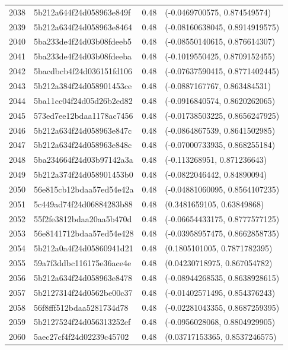 \begin{table}[ht]
\begin{tabular}{rlrl}
  2038 & 5b212a644f24d058963e849f & 0.48 & (-0.0469700575, 0.874549574) \\ 
  2039 & 5b212a634f24d058963e8464 & 0.48 & (-0.08160638045, 0.8914919575) \\ 
  2040 & 5ba233de4f24d03b08fdeeb5 & 0.48 & (-0.08550140615, 0.876614307) \\ 
  2041 & 5ba233de4f24d03b08fdeeba & 0.48 & (-0.1019550425, 0.8709152455) \\ 
  2042 & 5bacdbcb4f24d036151fd106 & 0.48 & (-0.07637590415, 0.8771402445) \\ 
  2043 & 5b212a384f24d058901453ce & 0.48 & (-0.0887167767, 0.863484531) \\ 
  2044 & 5ba11cc04f24d05d26b2ed82 & 0.48 & (-0.0916840574, 0.8620262065) \\ 
  2045 & 573ed7ee12bdaa1178ac7456 & 0.48 & (-0.01738503225, 0.8656247925) \\ 
  2046 & 5b212a634f24d058963e847c & 0.48 & (-0.0864867539, 0.8641502985) \\ 
  2047 & 5b212a634f24d058963e848c & 0.48 & (-0.07000733935, 0.868255184) \\ 
  2048 & 5ba234664f24d03b97142a3a & 0.48 & (-0.113268951, 0.871236643) \\ 
  2049 & 5b212a374f24d058901453b0 & 0.48 & (-0.0822046442, 0.84890094) \\ 
  2050 & 56e815cb12bdaa57ed54e42a & 0.48 & (-0.04881060095, 0.8564107235) \\ 
  2051 & 5c449ad74f24d06884283b88 & 0.48 & (0.3481659105, 0.63849868) \\ 
  2052 & 55f2fe3812bdaa20aa5b470d & 0.48 & (-0.06654433175, 0.8777577125) \\ 
  2053 & 56e8141712bdaa57ed54e428 & 0.48 & (-0.03958957475, 0.8662858735) \\ 
  2054 & 5b212a0a4f24d05860941d21 & 0.48 & (0.1805101005, 0.7871782395) \\ 
  2055 & 59a7f3ddbc116175e36ace4e & 0.48 & (0.04230718975, 0.867054782) \\ 
  2056 & 5b212a634f24d058963e8478 & 0.48 & (-0.08944268535, 0.8638928615) \\ 
  2057 & 5b2127314f24d0562be00c37 & 0.48 & (-0.01402571495, 0.854376243) \\ 
  2058 & 56f8fff512bdaa5281734d78 & 0.48 & (-0.02281043355, 0.8687259395) \\ 
  2059 & 5b2127524f24d056313252ef & 0.48 & (-0.0956028068, 0.8804929905) \\ 
  2060 & 5aec27cf4f24d02239c45702 & 0.48 & (0.03717153365, 0.8537246575) \\ 

\end{tabular}
\end{table}
